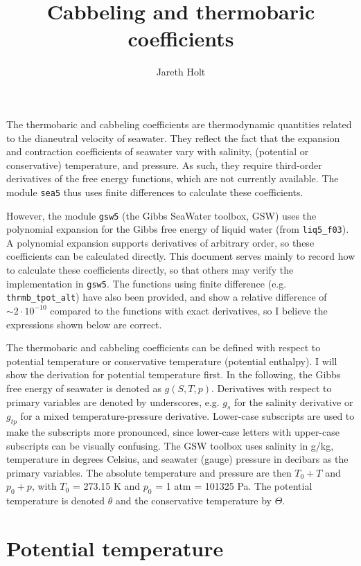 \documentclass{article}
\title{Cabbeling and thermobaric coefficients}
\author{Jareth Holt}
\begin{document}
\maketitle

The thermobaric and cabbeling coefficients are thermodynamic quantities related to the dianeutral velocity of seawater. They reflect the fact that the expansion and contraction coefficients of seawater vary with salinity, (potential or conservative) temperature, and pressure. As such, they require third-order derivatives of the free energy functions, which are not currently available. The module \texttt{sea5} thus uses finite differences to calculate these coefficients.

However, the module \texttt{gsw5} (the Gibbs SeaWater toolbox, GSW) uses the polynomial expansion for the Gibbs free energy of liquid water (from \texttt{liq5\_f03}). A polynomial expansion supports derivatives of arbitrary order, so these coefficients can be calculated directly. This document serves mainly to record how to calculate these coefficients directly, so that others may verify the implementation in \texttt{gsw5}. The functions using finite difference (e.g. \texttt{thrmb\_tpot\_alt}) have also been provided, and show a relative difference of $\sim 2\cdot 10^{-10}$ compared to the functions with exact derivatives, so I believe the expressions shown below are correct.

The thermobaric and cabbeling coefficients can be defined with respect to potential temperature or conservative temperature (potential enthalpy). I will show the derivation for potential temperature first. In the following, the Gibbs free energy of seawater is denoted as $g(S,T,p)$. Derivatives with respect to primary variables are denoted by underscores, e.g. $g_s$ for the salinity derivative or $g_{tp}$ for a mixed temperature-pressure derivative. Lower-case subscripts are used to make the subscripts more pronounced, since lower-case letters with upper-case subscripts can be visually confusing. The GSW toolbox uses salinity in g/kg, temperature in degrees Celsius, and seawater (gauge) pressure in decibars as the primary variables. The absolute temperature and pressure are then $T_0 + T$ and $p_0 + p$, with $T_0$ = 273.15 K and $p_0$ = 1 atm = 101325 Pa. The potential temperature is denoted $\theta$ and the conservative temperature by $\Theta$.



\section{Potential temperature}
\end{document}

